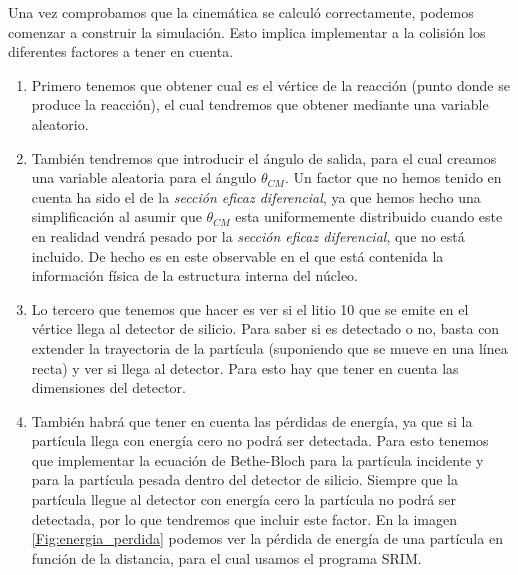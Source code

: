 \documentclass[12pt,a4paper]{article}
\numberwithin{equation}{section}
\numberwithin{figure}{section}
\begin{document}
Una vez comprobamos que la cinemática se calculó correctamente, podemos comenzar a construir la simulación. Esto implica implementar a la colisión los diferentes factores a tener en cuenta. 


\begin{enumerate}

    \item  Primero tenemos que obtener cual es el vértice de la reacción (punto donde se produce la reacción), el cual tendremos que obtener mediante una variable aleatorio. 
    
    \item También tendremos que introducir el ángulo de salida, para el cual creamos una variable aleatoria para el ángulo $\theta_{CM}$. Un factor que no hemos tenido en cuenta ha sido el de la {\it sección eficaz diferencial}, ya que hemos hecho una simplificación al asumir que $\theta_{CM}$ esta uniformemente distribuido cuando este en realidad vendrá pesado por la {\it sección eficaz diferencial}, que no está incluido. De hecho es en este observable en el que está contenida la información física de la estructura interna del núcleo. 
    
    \item Lo tercero que tenemos que hacer es ver si el litio 10 que se emite en el vértice llega al detector de silicio. Para saber si es detectado o no, basta con extender la trayectoria de la partícula (suponiendo que se mueve en una línea recta) y ver si llega al detector. Para esto hay que tener en cuenta las dimensiones del detector.     

    \item También habrá que tener en cuenta las pérdidas de energía, ya que si la partícula llega con energía cero no podrá ser detectada. Para esto tenemos que implementar la ecuación de Bethe-Bloch para la partícula incidente y para la partícula pesada dentro del detector de silicio. Siempre que la partícula llegue al detector con energía cero la partícula no podrá ser detectada, por lo que tendremos que incluir este factor. En la imagen \ref{Fig:energia_perdida} podemos ver la pérdida de energía de una partícula en función de la distancia, para el cual usamos el programa SRIM. 
    

\end{enumerate}
\end{document}
